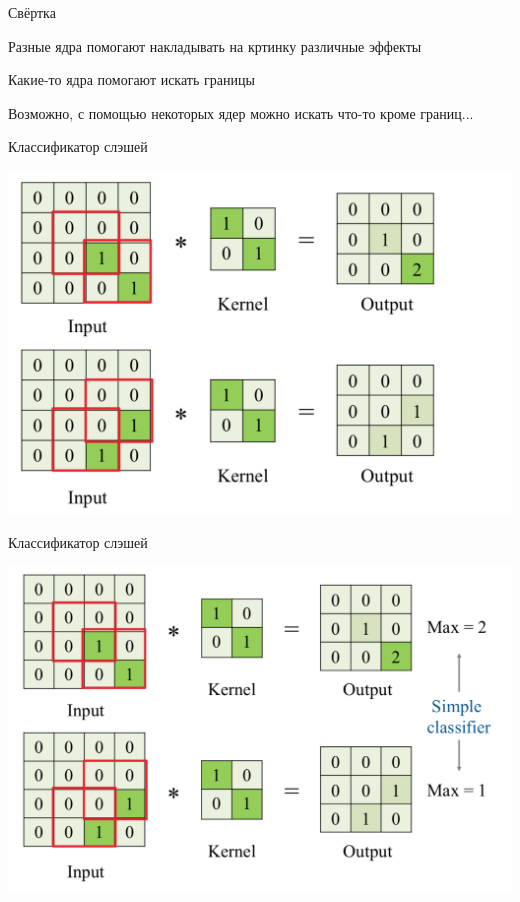 \documentclass[notes,12pt, aspectratio=169]{beamer}
\newenvironment{wideitemize}{\itemize\addtolength{\itemsep}{10pt}}{\enditemize}
\begin{document}
\begin{frame}{Свёртка}
\begin{wideitemize}
	\item Разные ядра помогают накладывать на кртинку различные эффекты
	\item Какие-то ядра помогают искать границы
	\item Возможно, с помощью некоторых ядер можно искать что-то кроме границ...
\end{wideitemize}
\end{frame}



\begin{frame}{Классификатор слэшей}
\begin{center}
	\includegraphics[width=.75\linewidth]{conv_1.png}
\end{center}
\end{frame}


\begin{frame}{Классификатор слэшей}
\begin{center}
	\includegraphics[width=.8\linewidth]{conv_2.png}
\end{center}
\end{frame}
\end{document}
